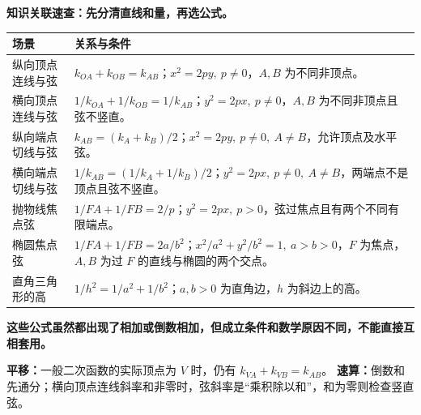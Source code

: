 \clearpage
\begin{summarybox}
\textbf{\textcolor{CSummary}{知识关联速查：先分清直线和量，再选公式。}}

\begingroup
\renewcommand{\arraystretch}{1.65}
\begin{tabularx}{\linewidth}{@{}p{.31\linewidth}X@{}}
\hline
场景 & 关系与条件\\ \hline
纵向顶点连线与弦 & $k_{OA}+k_{OB}=k_{AB}$；$x^2=2py,\ p\ne0$，$A,B$ 为不同非顶点。\\
横向顶点连线与弦 & $1/k_{OA}+1/k_{OB}=1/k_{AB}$；$y^2=2px,\ p\ne0$，$A,B$ 为不同非顶点且弦不竖直。\\
纵向端点切线与弦 & $k_{AB}=(k_A+k_B)/2$；$x^2=2py,\ p\ne0,\ A\ne B$，允许顶点及水平弦。\\
横向端点切线与弦 & $1/k_{AB}=(1/k_A+1/k_B)/2$；$y^2=2px,\ p\ne0,\ A\ne B$，两端点不是顶点且弦不竖直。\\
抛物线焦点弦 & $1/FA+1/FB=2/p$；$y^2=2px,\ p>0$，弦过焦点且有两个不同有限端点。\\
椭圆焦点弦 & $1/FA+1/FB=2a/b^2$；$x^2/a^2+y^2/b^2=1,\ a>b>0$，$F$ 为焦点，$A,B$ 为过 $F$ 的直线与椭圆的两个交点。\\
直角三角形的高 & $1/h^2=1/a^2+1/b^2$；$a,b>0$ 为直角边，$h$ 为斜边上的高。\\ \hline
\end{tabularx}
\endgroup

\medskip
\textbf{这些公式虽然都出现了相加或倒数相加，但成立条件和数学原因不同，不能直接互相套用。}

\medskip
\textbf{平移：}一般二次函数的实际顶点为 $V$ 时，仍有 $k_{VA}+k_{VB}=k_{AB}$。
\textbf{速算：}倒数和先通分；横向顶点连线斜率和非零时，弦斜率是“乘积除以和”，和为零则检查竖直弦。
\end{summarybox}
